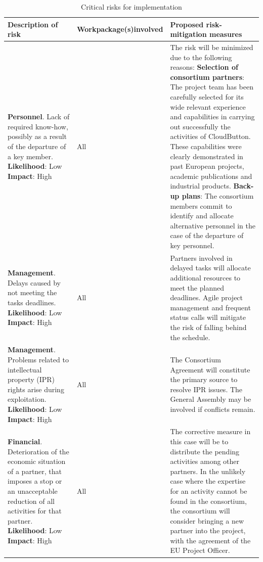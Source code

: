 \documentclass[a4paper,11pt]{article}
\newcommand{\proj}{CloudButton\xspace}
\begin{document}
{
\noindent
\def\arraystretch{1.3}
\begin{longtable} {| p{} | p{} | p{} | }
  \caption{
    \label{tab:risk}
    Critical risks for implementation}\\
\hline
\rowcolor[gray]{0.8}
\textbf{Description of risk} & 
\textbf{Work\newline package(s)\newline involved} & 
\textbf{Proposed risk-mitigation measures} \\ \hline
 
\textbf{Personnel}. Lack of required know-how, possibly as a result of the departure of a key member.\newline
\textbf{Likelihood}: Low \newline
\textbf{Impact}: High 
& All &
The risk will be minimized due to the following reasons:
\textbf{Selection of consortium partners}:
The project team has been carefully selected for its wide relevant experience and capabilities in carrying out successfully the activities of \proj.
These capabilities were clearly demonstrated in past European projects, academic publications and industrial products.\newline
\textbf{Back-up plans}:
The consortium members commit to identify and allocate alternative personnel in the case of the departure of key personnel. \\ \hline

\textbf{Management}. Delays caused by not meeting the tasks deadlines. \newline
\textbf{Likelihood}: Low \newline
\textbf{Impact}: High
& All &
Partners involved in delayed tasks will allocate additional resources to meet the planned deadlines.  Agile project management and frequent status calls will mitigate the risk of falling behind the schedule. \\ \hline

\textbf{Management}. Problems related to intellectual property (IPR) rights arise during exploitation. \newline
\textbf{Likelihood}: Low \newline
\textbf{Impact}: High
& All &
The Consortium Agreement will constitute the primary source to resolve IPR issues. The General Assembly may be involved if conflicts remain. \\ \hline

\textbf{Financial}. Deterioration of the economic situation of a partner, that imposes a stop or an unacceptable reduction of all activities for that partner.\newline
\textbf{Likelihood}: Low \newline
\textbf{Impact}: High
& All &
The corrective measure in this case will be to distribute the pending activities among other partners.
In the unlikely case where the expertise for an activity cannot be found in the consortium, the consortium will consider bringing a new partner into the project, with the agreement of the EU Project Officer.\newline
\\ \hline


\end{longtable}}
\end{document}

